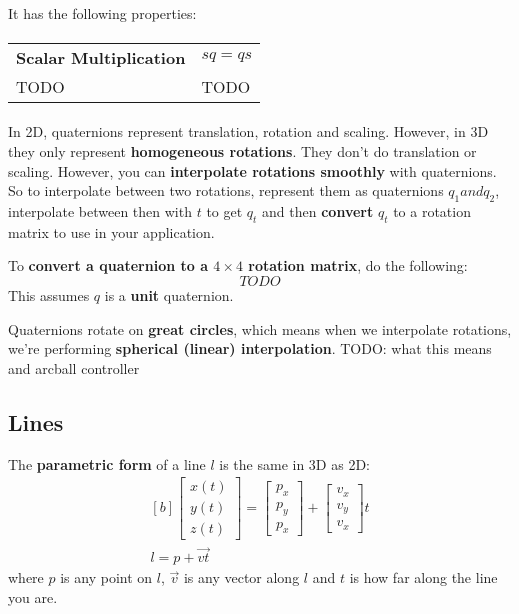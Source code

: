\documentclass{article}
\begin{document}
\paragraph{}
It has the following properties:
\paragraph{}
\begin{tabular}{ll}
	\textbf{Scalar Multiplication} & $sq = qs$ \\
	TODO & TODO \\
\end{tabular}
\paragraph{}

In 2D, quaternions represent translation, rotation and scaling. However, in 3D they only represent \textbf{homogeneous rotations}. They don't do translation or scaling. However, you can \textbf{interpolate rotations smoothly} with quaternions. So to interpolate between two rotations, represent them as quaternions $q_1 and q_2$, interpolate between then with $t$ to get $q_t$ and then \textbf{convert} $q_t$ to a rotation matrix to use in your application.

To \textbf{convert a quaternion to a $4 \times 4$ rotation matrix}, do the following:
\begin{equation}
	TODO
\label{eq:quat-to-matrix}
\end{equation}
This assumes $q$ is a \textbf{unit} quaternion.

Quaternions rotate on \textbf{great circles}, which means when we interpolate rotations, we're performing \textbf{spherical (linear) interpolation}. TODO: what this means and arcball controller

\subsection{Lines}

The \textbf{parametric form} of a line $l$ is the same in 3D as 2D:
\begin{equation}
	\begin{aligned}[b]
	\left[ \begin{matrix} x(t) \\ y(t) \\ z(t) \end{matrix} \right] =
	\left[ \begin{matrix} p_x \\ p_y \\ p_x \end{matrix} \right]
	+
	\left[ \begin{matrix} v_x \\ v_y \\ v_x \end{matrix} \right]
	t
	\\
	l = p + \vec{vt}
	\end{aligned}
	\label{eq:parametric-3d-line}
\end{equation}
where $p$ is any point on $l$, $\vec{v}$ is any vector along $l$ and $t$ is how far along the line you are.
\end{document}

